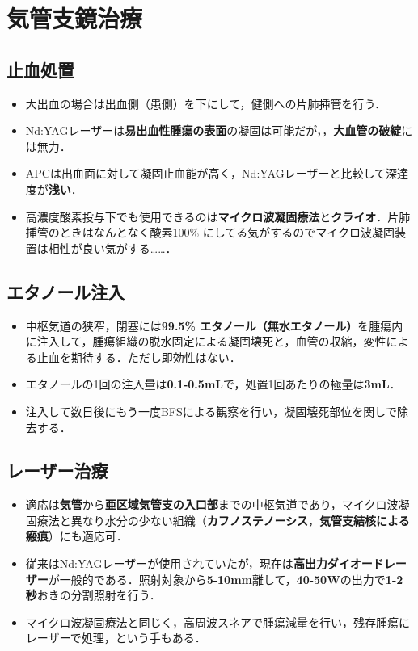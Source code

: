 \newpage
\section{気管支鏡治療}
\subsection{止血処置}
\begin{itemize}
\item 大出血の場合は出血側（患側）を下にして，健側への片肺挿管を行う．
\item Nd:YAGレーザーは\textbf{易出血性腫瘍の表面}の凝固は可能だが，，\textbf{大血管の破綻}には無力．
\item APCは出血面に対して凝固止血能が高く，Nd:YAGレーザーと比較して深達度が\textbf{浅い}．
\item 高濃度酸素投与下でも使用できるのは\textbf{マイクロ波凝固療法}と\textbf{クライオ}．片肺挿管のときはなんとなく酸素100\% にしてる気がするのでマイクロ波凝固装置は相性が良い気がする……．
\end{itemize}

\subsection{エタノール注入}
\begin{itemize}

\item 中枢気道の狭窄，閉塞には\textbf{99.5\% エタノール（無水エタノール）}を腫瘍内に注入して，腫瘍組織の脱水固定による凝固壊死と，血管の収縮，変性による止血を期待する．ただし即効性はない．
\item エタノールの1回の注入量は\textbf{0.1-0.5mL}で，処置1回あたりの極量は\textbf{3mL}．
\item 注入して数日後にもう一度BFSによる観察を行い，凝固壊死部位を関しで除去する．
\end{itemize}

\subsection{レーザー治療}
\begin{itemize}
\item 適応は\textbf{気管}から\textbf{亜区域気管支の入口部}までの中枢気道であり，マイクロ波凝固療法と異なり水分の少ない組織（\textbf{カフノステノーシス}，\textbf{気管支結核による瘢痕}）にも適応可．
\item 従来はNd:YAGレーザーが使用されていたが，現在は\textbf{高出力ダイオードレーザー}が一般的である．照射対象から\textbf{5-10mm}離して，\textbf{40-50W}の出力で\textbf{1-2秒}おきの分割照射を行う．
\item マイクロ波凝固療法と同じく，高周波スネアで腫瘍減量を行い，残存腫瘍にレーザーで処理，という手もある．
\end{itemize}

